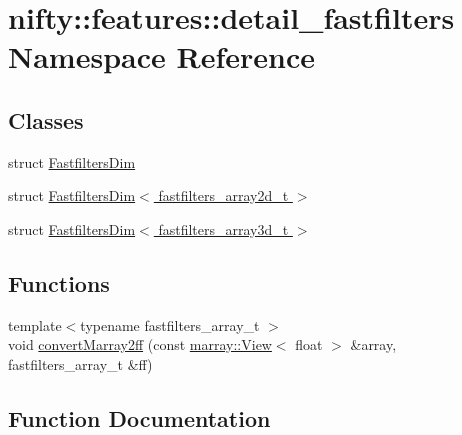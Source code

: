 \hypertarget{namespacenifty_1_1features_1_1detail__fastfilters}{}\section{nifty\+:\+:features\+:\+:detail\+\_\+fastfilters Namespace Reference}
\label{namespacenifty_1_1features_1_1detail__fastfilters}
\subsection*{Classes}
\begin{DoxyCompactItemize}
\item 
struct \hyperlink{structnifty_1_1features_1_1detail__fastfilters_1_1FastfiltersDim}{Fastfilters\+Dim}
\item 
struct \hyperlink{structnifty_1_1features_1_1detail__fastfilters_1_1FastfiltersDim_3_01fastfilters__array2d__t_01_4}{Fastfilters\+Dim$<$ fastfilters\+\_\+array2d\+\_\+t $>$}
\item 
struct \hyperlink{structnifty_1_1features_1_1detail__fastfilters_1_1FastfiltersDim_3_01fastfilters__array3d__t_01_4}{Fastfilters\+Dim$<$ fastfilters\+\_\+array3d\+\_\+t $>$}
\end{DoxyCompactItemize}
\subsection*{Functions}
\begin{DoxyCompactItemize}
\item 
{\footnotesize template$<$typename fastfilters\+\_\+array\+\_\+t $>$ }\\void \hyperlink{namespacenifty_1_1features_1_1detail__fastfilters_a41cdd24872d9ad84d89616e7c68eec05}{convert\+Marray2ff} (const \hyperlink{classandres_1_1View}{marray\+::\+View}$<$ float $>$ \&array, fastfilters\+\_\+array\+\_\+t \&ff)
\end{DoxyCompactItemize}


\subsection{Function Documentation}
\mbox{\label{namespacenifty_1_1features_1_1detail__fastfilters_a41cdd24872d9ad84d89616e7c68eec05}} 
